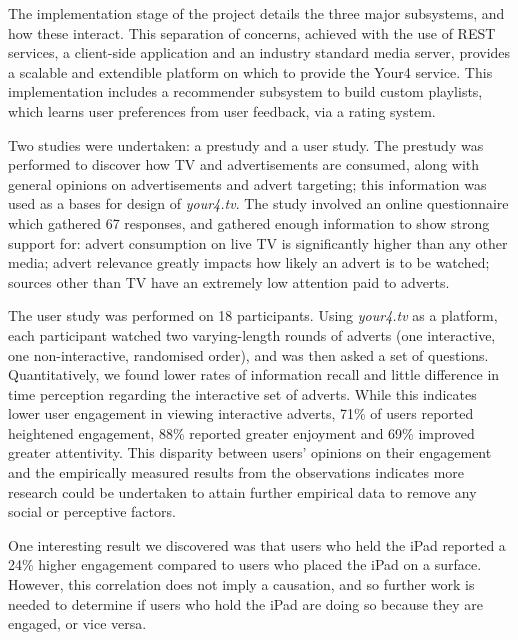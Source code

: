 The implementation stage of the project details the three major subsystems, and how these interact. This separation of concerns, achieved with the use of REST services, a client-side application and an industry standard media server, provides a scalable and extendible platform on which to provide the Your4 service. This implementation includes a recommender subsystem to build custom playlists, which learns user preferences from user feedback, via a rating system.

Two studies were undertaken: a prestudy and a user study. The prestudy was performed to discover how TV and advertisements are consumed, along with general opinions on advertisements and advert targeting; this information was used as a bases for design of \textit{your4.tv}. The study involved an online questionnaire which gathered 67 responses, and gathered enough information to show strong support for: advert consumption on live TV is significantly higher than any other media; advert relevance greatly impacts how likely an advert is to be watched; sources other than TV have an extremely low attention paid to adverts.

The user study was performed on 18 participants. Using \textit{your4.tv} as a platform, each participant watched two varying-length rounds of adverts (one interactive, one non-interactive, randomised order), and was then asked a set of questions. Quantitatively, we found lower rates of information recall and little difference in time perception regarding the interactive set of adverts. While this indicates lower user engagement in viewing interactive adverts, 71\% of users reported heightened engagement, 88\% reported greater enjoyment and 69\% improved greater attentivity. This disparity between users' opinions on their engagement and the empirically measured results from the observations indicates more research could be undertaken to attain further empirical data to remove any social or perceptive factors. 

One interesting result we discovered was that users who held the iPad reported a 24\% higher engagement compared to users who placed the iPad on a surface. However, this correlation does not imply a causation, and so further work is needed to determine if users who hold the iPad are doing so because they are engaged, or vice versa.
